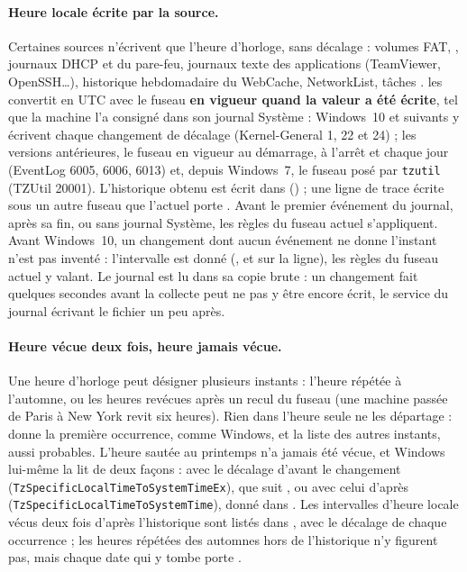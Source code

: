 \documentclass[11pt,a4paper,oneside]{report}
\begin{document}
\paragraph{Heure locale écrite par la source.}\label{sec:fuseaux} Certaines sources n'écrivent
que l'heure d'horloge, sans décalage : volumes FAT, ,
journaux DHCP et du pare-feu, journaux texte des applications (TeamViewer,
OpenSSH\ldots), historique hebdomadaire du WebCache, NetworkList, tâches
. \wac{} les convertit en UTC avec le fuseau \textbf{en vigueur
quand la valeur a été écrite}, tel que la machine l'a consigné dans son
journal Système : Windows~10 et suivants y écrivent chaque changement de
décalage (Kernel-General 1, 22 et 24) ; les versions antérieures, le fuseau en
vigueur au démarrage, à l'arrêt et chaque jour (EventLog 6005, 6006, 6013) et,
depuis Windows~7, le fuseau posé par \texttt{tzutil} (TZUtil 20001).
L'historique obtenu est écrit dans 
() ; une ligne de trace écrite sous un
autre fuseau que l'actuel porte . Avant le premier
événement du journal, après sa fin, ou sans journal Système, les règles du
fuseau actuel s'appliquent. Avant Windows~10, un changement dont aucun
événement ne donne l'instant n'est pas inventé : l'intervalle est donné
(, et  sur la
ligne), les règles du fuseau actuel y valant. Le journal est lu dans sa copie
brute : un changement fait quelques secondes avant la collecte peut ne pas y
être encore écrit, le service du journal écrivant le fichier un peu après.

\paragraph{Heure vécue deux fois, heure jamais vécue.} Une heure d'horloge
peut désigner plusieurs instants : l'heure répétée à l'automne, ou les heures
revécues après un recul du fuseau (une machine passée de Paris à New York revit
six heures). Rien dans l'heure seule ne les départage :  donne la
première occurrence, comme Windows, et  la liste des
autres instants, aussi probables. L'heure sautée au printemps n'a jamais été
vécue, et Windows lui-même la lit de deux façons : avec le décalage d'avant le
changement (\texttt{TzSpecificLocalTimeToSystemTimeEx}), que suit
, ou avec celui d'après (\texttt{TzSpecificLocalTimeToSystemTime}),
donné dans . Les intervalles d'heure locale vécus deux
fois d'après l'historique sont listés dans
, avec le décalage de chaque
occurrence ; les heures répétées des automnes hors de l'historique n'y
figurent pas, mais chaque date qui y tombe porte .
\end{document}
